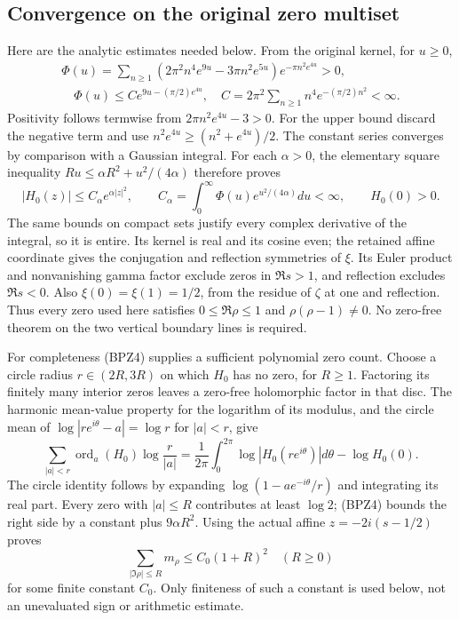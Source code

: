 \subsection{Convergence on the original zero multiset}

Here are the analytic estimates needed below. From the original kernel,
for $u\ge0$,
\begin{equation}\tag{BPZ3}\begin{gathered}
 \Phi(u)=\sum_{n\ge1}
 (2\pi^2n^4e^{9u}-3\pi n^2e^{5u})e^{-\pi n^2e^{4u}}>0,\\
 \quad
 \Phi(u)\le C e^{9u-(\pi/2)e^{4u}},
 \quad C=2\pi^2\sum_{n\ge1}n^4e^{-(\pi/2)n^2}<\infty.\end{gathered}
\end{equation}
Positivity follows termwise from $2\pi n^2e^{4u}-3>0$.
For the upper bound discard the negative term and use
$n^2e^{4u}\ge(n^2+e^{4u})/2$. The constant series converges by comparison
with a Gaussian integral. For each $\alpha>0$, the elementary square
inequality $R u\le\alpha R^2+u^2/(4\alpha)$ therefore proves
\begin{equation}\tag{BPZ4}
 |H_0(z)|\le C_\alpha e^{\alpha|z|^2},\qquad
 C_\alpha=\int_0^\infty\Phi(u)e^{u^2/(4\alpha)}du<\infty,
 \qquad H_0(0)>0.
\end{equation}
The same bounds on compact sets justify every complex derivative of
the integral, so it is entire. Its kernel is real and its cosine even;
the retained affine coordinate gives the conjugation and reflection
symmetries of $\xi$. Its Euler product and nonvanishing gamma factor
exclude zeros in $\Re s>1$, and reflection excludes $\Re s<0$.
Also $\xi(0)=\xi(1)=1/2$, from the residue of $\zeta$ at one and
reflection. Thus every zero used here satisfies
$0\le\Re\rho\le1$ and $\rho(\rho-1)\ne0$.
No zero-free theorem on the two vertical boundary lines is required.

For completeness (BPZ4) supplies a sufficient polynomial zero count.
Choose a circle radius $r\in(2R,3R)$ on which $H_0$ has no zero, for
$R\ge1$. Factoring its finitely many interior zeros leaves a zero-free
holomorphic factor in that disc. The harmonic mean-value property for
the logarithm of its modulus, and
the circle mean of $\log|re^{i\theta}-a|=\log r$ for $|a|<r$, give
\[
 \sum_{|a|<r}\operatorname{ord}_a(H_0)\log\frac r{|a|}
 =\frac1{2\pi}\int_0^{2\pi}\log|H_0(re^{i\theta})|d\theta
   -\log H_0(0).
\]
The circle identity follows by expanding
$\log(1-ae^{-i\theta}/r)$ and integrating its real part.
Every zero with $|a|\le R$ contributes at least $\log2$; (BPZ4)
bounds the right side by a constant plus $9\alpha R^2$.
Using the actual affine $z=-2i(s-1/2)$ proves
\begin{equation}\tag{BPZ5}
 \sum_{|\Im\rho|\le R}m_\rho\le C_0(1+R)^2
 \quad(R\ge0)
\end{equation}
for some finite constant $C_0$. Only finiteness of such a constant is
used below, not an unevaluated sign or arithmetic estimate.

